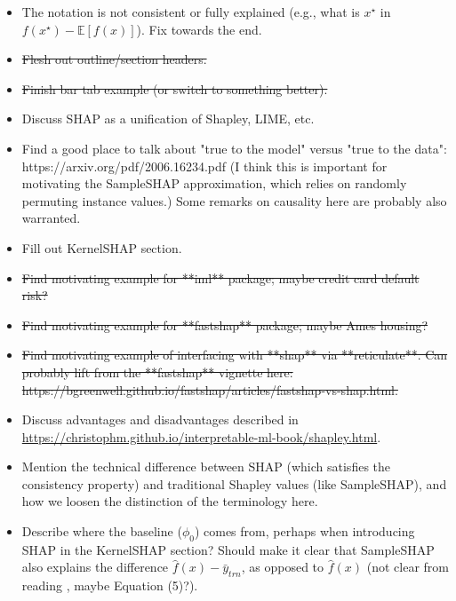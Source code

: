 \begin{itemize}

  \item The notation is not consistent or fully explained (e.g., what is $x^\star$ in $f\left(x^\star\right) - \mathbb{E}\left[f\left(x\right)\right]$). Fix towards the end.

  \item \sout{Flesh out outline/section headers.}
  
  \item \sout{Finish bar tab example (or switch to something better).}
  
  \item Discuss SHAP as a unification of Shapley, LIME, etc.
  
  \item Find a good place to talk about "true to the model" versus "true to the data": https://arxiv.org/pdf/2006.16234.pdf (I think this is important for motivating the SampleSHAP approximation, which relies on randomly permuting instance values.) Some remarks on causality here are probably also warranted.
  
  \item Fill out KernelSHAP section.
  
  \item \sout{Find motivating example for **iml** package; maybe credit card default risk?}
  
  \item \sout{Find motivating example for **fastshap** package; maybe Ames housing?}
  
  \item \sout{Find motivating example of interfacing with **shap** via **reticulate**. Can probably lift from the **fastshap** vignette here: https://bgreenwell.github.io/fastshap/articles/fastshap-vs-shap.html.}
  
  \item Discuss advantages and disadvantages described in \url{https://christophm.github.io/interpretable-ml-book/shapley.html}.
  
  \item Mention the technical difference between SHAP (which satisfies the consistency property) and traditional Shapley values (like SampleSHAP), and how we loosen the distinction of the terminology here.
  
  \item Describe where the baseline ($\phi_0$) comes from, perhaps when introducing SHAP in the KernelSHAP section? Should make it clear that SampleSHAP also explains the difference $\widehat{f}\left(x\right) - \bar{y}_{trn}$, as opposed to $\widehat{f}\left(x\right)$ (not clear from reading \citet{strumbelj-2014-explaining}, maybe Equation (5)?).
  

\end{itemize}
